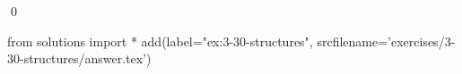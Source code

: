 
\begin{ex}
  \label{ex:3-30-structures}
  
  \qed
\end{ex}
\begin{python0}
from solutions import *
add(label="ex:3-30-structures",
    srcfilename='exercises/3-30-structures/answer.tex')
\end{python0}

